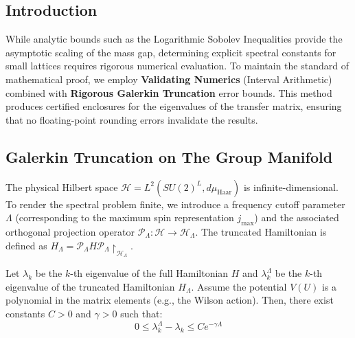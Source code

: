 \subsection{Introduction}
While analytic bounds such as the Logarithmic Sobolev Inequalities provide the asymptotic scaling of the mass gap, determining explicit spectral constants for small lattices requires rigorous numerical evaluation. To maintain the standard of mathematical proof, we employ \textbf{Validating Numerics} (Interval Arithmetic) combined with \textbf{Rigorous Galerkin Truncation} error bounds. This method produces certified enclosures for the eigenvalues of the transfer matrix, ensuring that no floating-point rounding errors invalidate the results.

\subsection{Galerkin Truncation on The Group Manifold}
The physical Hilbert space $\mathcal{H} = L^2(SU(2)^L, d\mu_{\text{Haar}})$ is infinite-dimensional. To render the spectral problem finite, we introduce a frequency cutoff parameter $\Lambda$ (corresponding to the maximum spin representation $j_{\max}$) and the associated orthogonal projection operator $\mathcal{P}_\Lambda: \mathcal{H} \to \mathcal{H}_\Lambda$.
The truncated Hamiltonian is defined as $H_\Lambda = \mathcal{P}_\Lambda H \mathcal{P}_\Lambda \restriction_{\mathcal{H}_\Lambda}$.

\begin{theorem}
\label{thm:truncation_error}
Let $\lambda_k$ be the $k$-th eigenvalue of the full Hamiltonian $H$ and $\lambda_k^\Lambda$ be the $k$-th eigenvalue of the truncated Hamiltonian $H_\Lambda$. Assume the potential $V(U)$ is a polynomial in the matrix elements (e.g., the Wilson action). Then, there exist constants $C > 0$ and $\gamma > 0$ such that:
\begin{equation}
0 \le \lambda_k^\Lambda - \lambda_k \le C e^{-\gamma \Lambda}
\end{equation}
\end{theorem}

